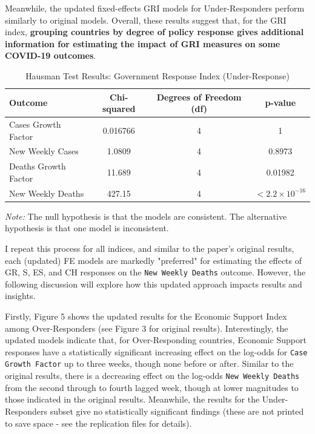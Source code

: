 \documentclass[12pt,letterpaper]{article}
\begin{document}
	
		
	\noindent Meanwhile, the updated fixed-effects GRI models for Under-Responders perform similarly to original models. Overall, these results suggest that, for the GRI index, \textbf{grouping countries by degree of policy response gives additional information for estimating the impact of GRI measures on some COVID-19 outcomes}.
	
	\begin{table}[ht]
		\centering
		\caption{Hausman Test Results: Government Response Index (Under-Response)}
		\label{tab:hausman_test3}
		\begin{tabular}{lccc}
			\hline
			\textbf{Outcome} & \textbf{Chi-squared} & \textbf{Degrees of Freedom (df)} & \textbf{p-value} \\
			\hline
			Cases Growth Factor & 0.016766 & 4 & 1 \\
			New Weekly Cases & 1.0809 & 4 & 0.8973 \\
			Deaths Growth Factor & 11.689 & 4 & 0.01982 \\
			New Weekly Deaths & 427.15 & 4 & $< 2.2 \times 10^{-16}$ \\
			\hline
		\end{tabular}
		\begin{flushleft}
			\emph{Note:} The null hypothesis is that the models are consistent. The alternative hypothesis is that one model is inconsistent.
		\end{flushleft}
	\end{table}
	
		
	
	\noindent I repeat this process for all indices, and similar to the paper's original results, each (updated) FE models are markedly "preferred" for estimating the effects of GR, S, ES, and CH responses on the \texttt{New Weekly Deaths} outcome. However, the following discussion will explore how this updated approach impacts results and insights.
	
	\vspace{.25cm}
	
	\noindent Firstly, Figure 5 shows the updated results for the Economic Support Index among Over-Responders (see Figure 3 for original results). Interestingly, the updated models indicate that, for Over-Responding countries, Economic Support responses have a statistically significant increasing effect on the log-odds for \texttt{Case Growth Factor} up to three weeks, though none before or after. Similar to the original results, there is a decreasing effect on the log-odds \texttt{New Weekly Deaths} from the second through to fourth lagged week, though at lower magnitudes to those indicated in the original results. Meanwhile, the results for the Under-Responders subset give no statistically significant findings (these are not printed to save space - see the replication files for details).
	
\end{document}
